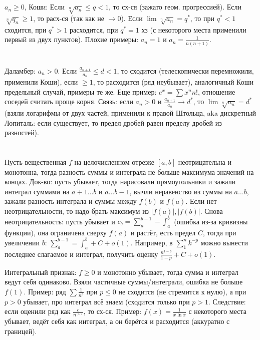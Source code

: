 \section{} %
$a_n \ge 0$, Коши:
Если $\sqrt[n]{a_n} \le q < 1$, то сх-ся (зажато геом. прогрессией). 
Если $\sqrt[n]{q_n} \ge 1$, то расх-ся (так как не $\to 0$).
Если $\lim \sqrt[n]{a_n} = q^*$, то при $q^* < 1$ сходится, при $q^* > 1$ расходится, при $q^*=1$ хз (с некоторого места применили первый из двух пунктов).
Плохие примеры: $a_n=1$ и $a_n=\frac{1}{n(n+1)}$.

\section{} %
Даламбер: $a_n > 0$.
Если $\frac{a_{n+1}}{a_n} \le d < 1$, то сходится (телескопически перемножили, применили Коши), если $\ge 1$, то расходится (ряд неубывает),
аналогичный Коши предельный случай, примеры те же.
Еще пример: $e^x=\sum {x^n}{n!}$, отношение соседей считать проще корня.
Связь: если $a_n > 0$ и $\frac{a_{n+1}}{a_n} \to d^*$, то $\lim \sqrt[n]{a_n} = d^*$ (взяли логарифмы от двух частей,
применили к правой Штольца, aka дискретный Лопиталь: если существует, то предел дробей равен пределу дробей из разностей).

\section{} %
Пусть вещественная $f$ на целочисленном отрезке $[a,b]$ неотрицательна и монотонна, тогда разность суммы и интеграла не больше
максимума значений на концах.
Док-во: пусть убывает, тогда нарисовали прямоугольники и зажали интеграл суммами на $a+1\dots b$ и $a\dots b-1$,
вычли неравенство из суммы на $a\dots b$, зажали разность интеграла и суммы между $f(b)$ и $f(a)$.
Если нет неотрицательности, то надо брать максимум из $|f(a)|, |f(b)|$.
Снова неотрицательность: пусть убывает и $c_b = \sum_a^{b-1} - \int_a^b$ (ошибка из-за кривизны функции), она ограничена сверху $f(a)$ и растёт,
есть предел $C$, тогда при увеличении $b$: $\sum_a^{b-1} = \int_a^b + C + o(1)$.
Например, в $\sum_1^n k^{-p}$ можно вынести последнее слагаемое и интеграл, получить оценку $\frac{n^{1-p}}{1-p} + C + o(1)$.

Интегральный признак: $f \ge 0$ и монотонно убывает, тогда сумма и интеграл ведут себя одинаково.
Взяли частичные суммы/интеграли, ошибка не больше $f(1)$.
Пример: ряд $\sum \frac{1}{n^p}$ при $p\le0$ не сходится (не стремится к нулю), а при $p>0$ убывает, про интеграл всё знаем (сходится только при $p>1$.
Следствие: если оценили ряд как $\frac{c}{n^{>1}}$, то сх-ся.
Пример: $f(x)=\frac{1}{x \ln x}$ с некоторого места убывает, ведёт себя как интеграл, а он берётся и расходится (аккуратно с границей).

